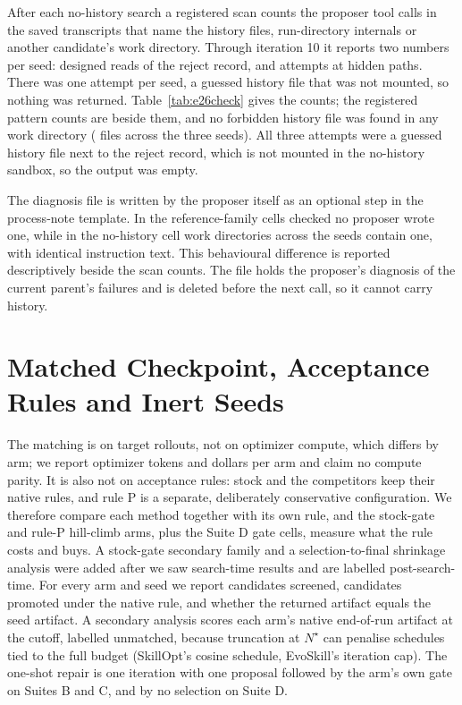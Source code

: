 After each no-history search a registered scan counts the proposer tool calls in the saved transcripts that name the history files, run-directory internals or another candidate's work directory. Through iteration 10 it reports two numbers per seed: designed reads of the reject record, and attempts at hidden paths. There was one attempt per seed, a guessed history file that was not mounted, so nothing was returned. Table~\ref{tab:e26check} gives the counts; the registered pattern counts are beside them, and no forbidden history file was found in any work directory (\noHistForbiddenFiles{} files across the three seeds). All three attempts were a guessed history file next to the reject record, which is not mounted in the no-history sandbox, so the output was empty.

\begin{table}[h]
\caption{Manipulation check for the no-history cell on Suite D, iterations 1 to 10 per seed. Designed reads are proposer tool calls naming the reject record; registered hits use the broad registered pattern, most of which are the designed reads.}
\label{tab:e26check}
\centering\small

\end{table}
 The diagnosis file is written by the proposer itself as an optional step in the process-note template. In the reference-family cells checked no proposer wrote one, while in the no-history cell \noHistDiagFiles{} work directories across the seeds contain one, with identical instruction text. This behavioural difference is reported descriptively beside the scan counts. The file holds the proposer's diagnosis of the current parent's failures and is deleted before the next call, so it cannot carry history.

\section{Matched Checkpoint, Acceptance Rules and Inert Seeds}
\label{app:matching}

The matching is on target rollouts, not on optimizer compute, which differs by arm; we report optimizer tokens and dollars per arm and claim no compute parity. It is also not on acceptance rules: stock \capevolve{} and the competitors keep their native rules, and rule P is a separate, deliberately conservative configuration. We therefore compare each method together with its own rule, and the stock-gate and rule-P hill-climb arms, plus the Suite D gate cells, measure what the rule costs and buys. A stock-gate secondary family and a selection-to-final shrinkage analysis were added after we saw search-time results and are labelled post-search-time. For every arm and seed we report candidates screened, candidates promoted under the native rule, and whether the returned artifact equals the seed artifact. A secondary analysis scores each arm's native end-of-run artifact at the cutoff, labelled unmatched, because truncation at $N^\star$ can penalise schedules tied to the full budget (SkillOpt's cosine schedule, EvoSkill's iteration cap). The one-shot repair is one \capevolve{} iteration with one proposal followed by the arm's own gate on Suites B and C, and by no selection on Suite D.

